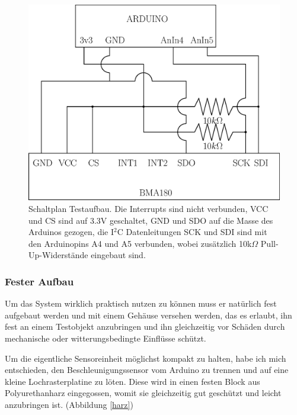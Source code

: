\documentclass[12pt,a4paper]{scrartcl}
\begin{document}
\begin{figure}[h]
\centering
\includegraphics[scale=.8]{schematics.eps}
\caption{Schaltplan Testaufbau. Die Interrupts sind nicht verbunden, VCC und CS sind auf 3.3V geschaltet, GND und SDO auf die Masse des Arduinos gezogen, die I$^2$C Datenleitungen SCK und SDI sind mit den Arduinopins A4 und A5 verbunden, wobei zusätzlich 10k$\Omega$ Pull-Up-Widerstände eingebaut sind.}
\label{schematics}
\end{figure}


\newpage
\subsubsection{Fester Aufbau}

Um das System wirklich praktisch nutzen zu können muss er natürlich fest aufgebaut werden und mit einem Gehäuse versehen werden, das es erlaubt, ihn fest an einem Testobjekt anzubringen und ihn gleichzeitig vor Schäden durch mechanische oder witterungsbedingte Einflüsse schützt.

Um die eigentliche Sensoreinheit möglichst kompakt zu halten, habe ich mich entschieden, den Beschleunigungssensor vom Arduino zu trennen und auf eine kleine Lochrasterplatine zu löten. Diese wird in einen festen Block aus Polyurethanharz \citep{Components:2010fk} eingegossen, womit sie gleichzeitig gut geschützt und leicht anzubringen ist.
(Abbildung \ref{harz}) \\
\end{document}
